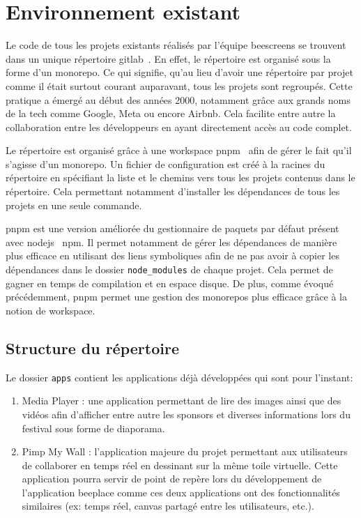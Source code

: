 \section{Environnement existant}

Le code de tous les projets existants réalisés par l'équipe \gls{beescreens} se trouvent dans un unique répertoire \gls{gitlab}~\cite{beescreens}. En effet, le répertoire est organisé sous la forme d'un monorepo. Ce qui signifie, qu'au lieu d'avoir une répertoire par projet comme il était surtout courant auparavant, tous les projets sont regroupés. Cette pratique a émergé au début des années 2000, notamment grâce aux grands noms de la tech comme Google, Meta ou encore Airbnb. Cela facilite entre autre la collaboration entre les développeurs en ayant directement accès au code complet.

Le répertoire est organisé grâce à une workspace \gls{pnpm}~\cite{pnpmworkspace} afin de gérer le fait qu'il s'agisse d'un monorepo. Un fichier de configuration est créé à la racines du répertoire en spécifiant la liste et le chemins vers tous les projets contenus dans le répertoire. Cela permettant notamment d'installer les dépendances de tous les projets en une seule commande.

\gls{pnpm} est une version améliorée du gestionnaire de paquets par défaut présent avec \gls{nodejs}~\cite{nodejs} \gls{npm}. Il permet notamment de gérer les dépendances de manière plus efficace en utilisant des liens symboliques afin de ne pas avoir à copier les dépendances dans le dossier \texttt{node_modules} de chaque projet. Cela permet de gagner en temps de compilation et en espace disque. De plus, comme évoqué précédemment, \gls{pnpm} permet une gestion des monorepos plus efficace grâce à la notion de workspace.

\subsection{Structure du répertoire}


Le dossier \texttt{apps} contient les applications déjà développées qui sont pour l'instant:

\begin{enumerate}
  \item Media Player : une application permettant de lire des images ainsi que des vidéos afin d'afficher entre autre les sponsors et diverses informations lors du festival sous forme de diaporama.
  \item Pimp My Wall : l'application majeure du projet permettant aux utilisateurs de collaborer en temps réel en dessinant sur la même toile virtuelle. Cette application pourra servir de point de repère lors du développement de l'application \gls{beeplace} comme ces deux applications ont des fonctionnalités similaires (ex: temps réel, canvas partagé entre les utilisateurs, etc.).
\end{enumerate}

